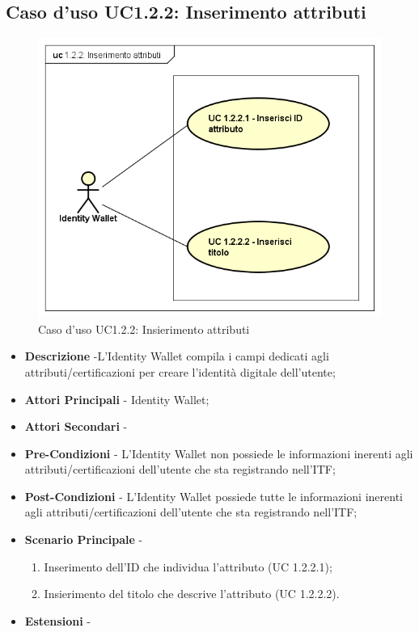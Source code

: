 \subsection{Caso d'uso UC1.2.2: Inserimento attributi}
\begin{figure}[h]
	\centering
	\includegraphics[scale=0.50]{immagini/usecase/UC122_InserimentoAttributi}
	\caption{Caso d'uso UC1.2.2: Insierimento attributi}
\end{figure}
\begin{itemize}
	\item \textbf{Descrizione} -L'Identity Wallet compila i campi dedicati agli attributi/certificazioni per creare l'identità digitale dell'utente;
	\item \textbf{Attori Principali} - Identity Wallet;
	\item \textbf{Attori Secondari} -
	\item \textbf{Pre-Condizioni} - L'Identity Wallet non possiede le informazioni inerenti agli attributi/certificazioni dell'utente che sta registrando nell'\gls{ITF};
	\item \textbf{Post-Condizioni} - L'Identity Wallet possiede tutte le informazioni inerenti agli attributi/certificazioni dell'utente che sta registrando nell'\gls{ITF};
	\item \textbf{Scenario Principale} -
	\begin{enumerate}
		\item Inserimento dell'ID che individua l'attributo (UC 1.2.2.1);
		\item Insierimento del titolo che descrive l'attributo (UC 1.2.2.2).
	\end{enumerate}
	\item \textbf{Estensioni} -
\end{itemize}
\newpage
